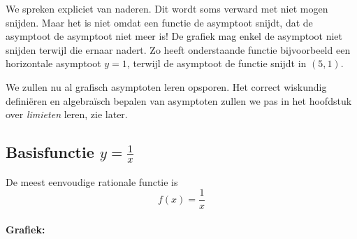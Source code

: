 \documentclass[a4paper,12pt]{article}
\begin{document}
We spreken expliciet van naderen. Dit wordt soms verward met niet mogen snijden. Maar het is niet omdat een functie de asymptoot snijdt, dat de asymptoot de asymptoot niet meer is! De grafiek mag enkel de asymptoot niet snijden terwijl die ernaar nadert. Zo heeft onderstaande functie bijvoorbeeld een horizontale asymptoot $y=1$, terwijl de asymptoot de functie snijdt in $(5,1)$.

\begin{center}
\end{center}

We zullen nu al grafisch asymptoten leren opsporen. Het correct wiskundig definiëren en algebraïsch bepalen van asymptoten zullen we pas in het hoofdstuk over {\em limieten} leren, zie later.

\subsection{Basisfunctie $y=\frac{1}{x}$}

De meest eenvoudige rationale functie is
$$f(x) = \dfrac{1}{x}$$

\paragraph{Grafiek:}\vspace*{-1cm}
\begin{center}
\end{center}
\end{document}
